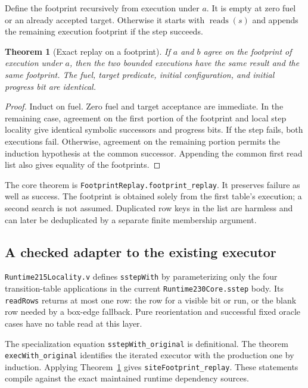 \documentclass[11pt,letterpaper]{article}
\newtheorem{theorem}{Theorem}[section]
\theoremstyle{definition}
\theoremstyle{remark}
\newcommand{\code}[1]{\texttt{#1}}
\begin{document}
Define the footprint recursively from execution under $a$. It is empty
at zero fuel or an already accepted target. Otherwise it starts with
$\operatorname{reads}(s)$ and appends the remaining execution footprint
if the step succeeds.

\begin{theorem}[Exact replay on a footprint]
\label{thm:footprint}
If $a$ and $b$ agree on the footprint of execution under $a$, then the two
bounded executions have the same result and the same footprint. The fuel,
target predicate, initial configuration, and initial progress bit are identical.
\end{theorem}

\begin{proof}
Induct on fuel. Zero fuel and target acceptance are immediate. In the
remaining case, agreement on the first portion of the footprint and local
step locality give identical symbolic successors and progress bits.
If the step fails, both executions fail. Otherwise, agreement on the
remaining portion permits the induction hypothesis at the common successor.
Appending the common first read list also gives equality of the footprints.
\end{proof}

The core theorem is \code{FootprintReplay.footprint\_replay}. It preserves
failure as well as success. The footprint is obtained solely from the first
table's execution; a second search is not assumed. Duplicated row keys in
the list are harmless and can later be deduplicated by a separate finite
membership argument.

\subsection{A checked adapter to the existing executor}

\code{Runtime215Locality.v} defines \code{sstepWith} by parameterizing only
the four transition-table applications in the current
\code{Runtime230Core.sstep} body. Its \code{readRows} returns at most one
row: the row for a visible bit or run, or the blank row needed by a box-edge
fallback. Pure reorientation and successful fixed oracle cases have no
table read at this layer.

The specialization equation \code{sstepWith\_original} is definitional.
The theorem \code{execWith\_original} identifies the iterated executor with
the production one by induction. Applying Theorem~\ref{thm:footprint}
gives \code{siteFootprint\_replay}. These statements compile against
the exact maintained runtime dependency sources.
\end{document}
